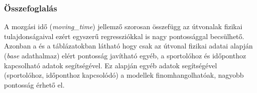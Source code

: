\begin{table}[!h]
	\centering
	\caption{Random Forest regresszió eredmények \textit{moving\_time} jellemző becslésére}
	\label{table:movingTimeRandomForest}
\end{table}




\subsubsection{Összefoglalás}
A mozgási idő (\textit{moving\_time}) jellemző szorosan összefügg az útvonalak fizikai tulajdonságaival ezért egyszerű regressziókkal is nagy pontossággal becsülhető. Azonban a  és a  táblázatokban látható hogy csak az útvonal fizikai adatai alapján (\textit{base} adathalmaz) elért pontosság javítható egyéb, a sportolóhoz és időponthoz kapcsolható adatok segítségével. Ez alapján 
egyéb adatok segítségével (sportolóhoz, időponthoz kapcsolódó) a modellek finomhangolhatóak, nagyobb pontosság érhető el. 



